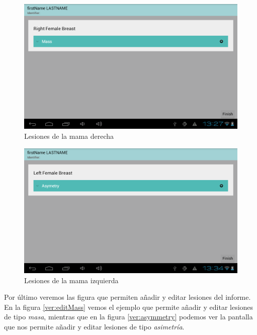\begin{figure}[ht]
\centering
\includegraphics[scale=0.4]{./imgs/verificacion/treeRFB.png}
\caption{Lesiones de la mama derecha}
\label{ver:treeRFB}
\end{figure}

\begin{figure}[ht]
\centering
\includegraphics[scale=0.4]{./imgs/verificacion/treeLFB.png}
\caption{Lesiones de la mama izquierda}
\label{ver:treeLFB}
\end{figure}

Por último veremos las figura que permiten añadir y editar lesiones del informe. En la figura \ref{ver:editMass} vemos el ejemplo que permite añadir y editar lesiones de tipo \emph{masa}, mientras que en la figura \ref{ver:asymmetry} podemos ver la pantalla que nos permite añadir y editar lesiones de tipo \emph{asimetría}.\medskip\par


